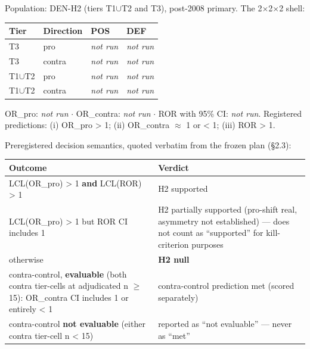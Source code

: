 Population: DEN-H2 (tiers T1$\cup$T2 and T3), post-2008 primary. The 2$\times$2$\times$2 shell:

\begin{longtable}[]{@{}llll@{}}
\toprule\noalign{}
Tier & Direction & POS & DEF \\
\midrule\noalign{}
\endhead
\bottomrule\noalign{}
\endlastfoot
T3 & pro & \emph{not run} & \emph{not run} \\
T3 & contra & \emph{not run} & \emph{not run} \\
T1$\cup$T2 & pro & \emph{not run} & \emph{not run} \\
T1$\cup$T2 & contra & \emph{not run} & \emph{not run} \\
\end{longtable}

OR\_pro: \emph{not run} $\cdot$ OR\_contra: \emph{not run} $\cdot$ ROR with 95\% CI: \emph{not run}. Registered predictions: (i) OR\_pro \textgreater{} 1; (ii) OR\_contra $\approx$ 1 or \textless{} 1; (iii) ROR \textgreater{} 1.

Preregistered decision semantics, quoted verbatim from the frozen plan (\S{}2.3):

\begin{longtable}[]{@{}
  >{\raggedright\arraybackslash}p{}
  >{\raggedright\arraybackslash}p{}@{}}
\toprule\noalign{}
\begin{minipage}[b]{\linewidth}\raggedright
Outcome
\end{minipage} & \begin{minipage}[b]{\linewidth}\raggedright
Verdict
\end{minipage} \\
\midrule\noalign{}
\endhead
\bottomrule\noalign{}
\endlastfoot
LCL(OR\_pro) \textgreater{} 1 \textbf{and} LCL(ROR) \textgreater{} 1 & H2 supported \\
LCL(OR\_pro) \textgreater{} 1 but ROR CI includes 1 & H2 partially supported (pro-shift real, asymmetry not established) --- does not count as ``supported'' for kill-criterion purposes \\
otherwise & \textbf{H2 null} \\
contra-control, \textbf{evaluable} (both contra tier-cells at adjudicated n $\ge$ 15): OR\_contra CI includes 1 or entirely \textless{} 1 & contra-control prediction met (scored separately) \\
contra-control \textbf{not evaluable} (either contra tier-cell n \textless{} 15) & reported as ``not evaluable'' --- never as ``met'' \\
\end{longtable}

